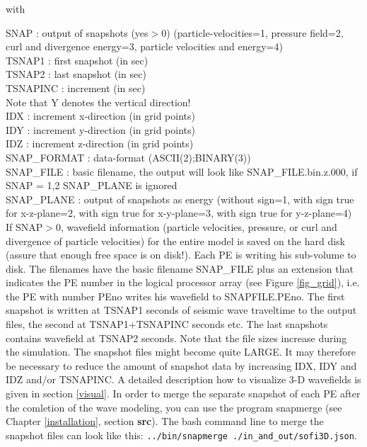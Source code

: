 \documentclass{hitec}
\begin{document}
with

SNAP : output of snapshots (yes$>$0) (particle-velocities=1, pressure field=2, curl and divergence energy=3, particle velocities and energy=4)\\
TSNAP1 : first snapshot (in sec)\\
TSNAP2 : last snapshot (in sec)\\
TSNAPINC : increment (in sec)\\
Note that Y denotes the vertical direction!\\
IDX : increment x-direction (in grid points)\\
IDY : increment y-direction (in grid points)\\
IDZ : increment z-direction (in grid points)\\
SNAP\_FORMAT : data-format (ASCII(2);BINARY(3))\\
SNAP\_FILE : basic filename, the output will look like SNAP\_FILE.bin.z.000, if SNAP = 1,2 SNAP\_PLANE is ignored\\
SNAP\_PLANE : output of snapshots as energy (without sign=1, with sign true for x-z-plane=2, with sign true for x-y-plane=3, with sign true for y-z-plane=4)\\


If SNAP$>0$, wavefield information (particle velocities, pressure, or curl and divergence of particle velocities) for the entire model is saved on the hard disk (assure that enough free space is on disk!). Each PE is writing his sub-volume to disk. The filenames have the basic filename SNAP\_FILE plus an extension that indicates the PE number in the logical processor array (see Figure \ref{fig_grid}), i.e. the PE with number PEno writes his wavefield to SNAPFILE.PEno. The first snapshot is written at TSNAP1 seconds of seismic wave traveltime to the output files, the second at TSNAP1+TSNAPINC seconds etc. The last snapshots contains wavefield at TSNAP2 seconds. Note that the file sizes increase during the simulation. The snapshot files might become quite LARGE. It may therefore be necessary to reduce the amount of snapshot data by increasing IDX, IDY and IDZ and/or TSNAPINC. A detailed description how to visualize 3-D wavefields is given in section \ref{visual}. In order to merge the separate snapshot of each PE after the comletion of the wave modeling, you can use the program snapmerge (see Chapter \ref{installation}, section \textbf{src}). The bash command line to merge the snapshot files can look like this:  \lstinline{../bin/snapmerge ./in_and_out/sofi3D.json}.
\end{document}
